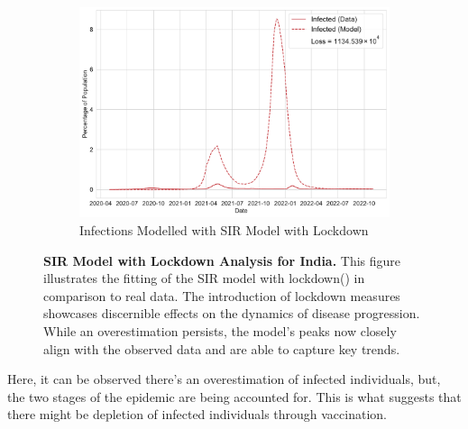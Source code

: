 \documentclass[tikz,fleqn,12pt]{wlscirep}
\begin{document}
\begin{figure}[htbp!]\ContinuedFloat
  \begin{subfigure}[t]{\textwidth}
    \centering
    \includegraphics[scale=0.50]{images/SIR_model_with_lockdown_infections_IND.pdf}
    \caption{Infections Modelled with SIR Model with Lockdown}
    \label{fig:SIR_model_with_lockdown_infections_IND}
  \end{subfigure}
  \caption{\textbf{SIR Model with Lockdown Analysis for India.} This figure illustrates the fitting of the SIR model with lockdown() in comparison to real data. The introduction of lockdown measures showcases discernible effects on the dynamics of disease progression. While an overestimation persists, the model's peaks now closely align with the observed data and are able to capture key trends.}
\end{figure}

Here, it can be observed there's an overestimation of infected individuals, but, the two stages of the epidemic are being accounted for. This is what suggests that there might be depletion of infected individuals through vaccination.
\end{document}
